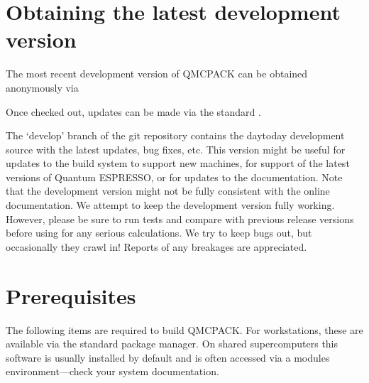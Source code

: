 \documentclass[letterpaper,10pt,english]{sphinxmanual}
\begin{document}
\section{Obtaining the latest development version}
\label{\detokenize{installation:obtaining-the-latest-development-version}}\label{\detokenize{installation:obdevelopment}}
The most recent development version of QMCPACK can be obtained
anonymously via

\begin{sphinxVerbatim}[commandchars=\\\{\}]
  
\end{sphinxVerbatim}

Once checked out, updates can be made via the standard .

The ‘develop’ branch of the git repository contains the day\sphinxhyphen{}to\sphinxhyphen{}day
development source with the latest updates, bug fixes, etc. This version
might be useful for updates to the build system to support new machines,
for support of the latest versions of Quantum ESPRESSO, or for updates
to the documentation. Note that the development version might not be
fully consistent with the online documentation. We attempt to keep the
development version fully working. However, please be sure to run tests
and compare with previous release versions before using for any serious
calculations. We try to keep bugs out, but occasionally they crawl in!
Reports of any breakages are appreciated.


\section{Prerequisites}
\label{\detokenize{installation:prerequisites}}\label{\detokenize{installation:id1}}
The following items are required to build QMCPACK. For workstations,
these are available via the standard package manager. On shared
supercomputers this software is usually installed by default and is
often accessed via a modules environment—check your system
documentation.
\end{document}
